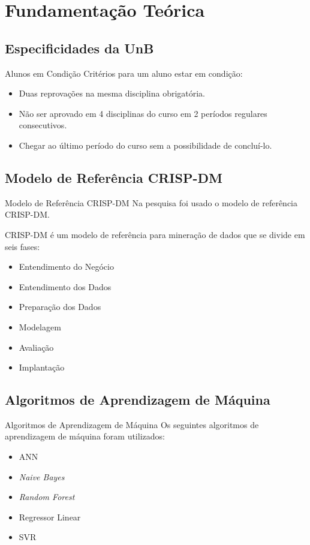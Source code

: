 \section{Fundamentação Teórica}
\subsection{Especificidades da UnB}
\begin{frame}{Alunos em Condição}
    Critérios para um aluno estar em condição: 
    \begin{itemize}
        \item Duas reprovações na mesma disciplina obrigatória.
        \item Não ser aprovado em 4 disciplinas do curso em 2 períodos regulares
            consecutivos.
        \item Chegar ao último período do curso sem a possibilidade de concluí-lo. 
    \end{itemize}
\end{frame}

\subsection{Modelo de Referência CRISP-DM}
\begin{frame}{Modelo de Referência CRISP-DM}
    Na pesquisa foi usado o modelo de referência CRISP-DM. 
    
    \vspace{0.5cm}

    CRISP-DM é um modelo de referência para mineração de dados que se divide em seis
    fases: 
    \begin{itemize}
        \item Entendimento do Negócio
        \item Entendimento dos Dados
        \item Preparação dos Dados
        \item Modelagem
        \item Avaliação 
        \item Implantação
    \end{itemize}
\end{frame}

\subsection{Algoritmos de Aprendizagem de Máquina}
\begin{frame}{Algoritmos de Aprendizagem de Máquina}
    Os seguintes algoritmos de aprendizagem de máquina foram utilizados: 
    \begin{itemize}
        \item ANN
        \item \textit{Naive Bayes}
        \item \textit{Random Forest}
        \item Regressor Linear
        \item SVR
    \end{itemize}
\end{frame}

